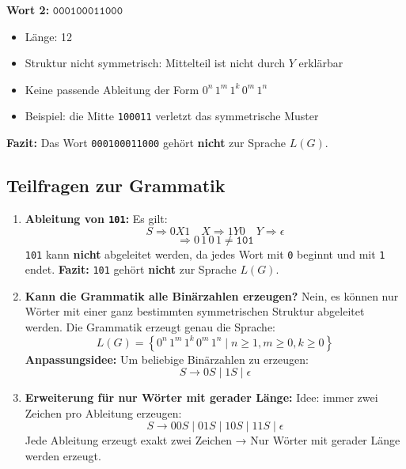 \documentclass[a4paper,12pt]{article}
\begin{document}
\textbf{Wort 2:} \( \texttt{000100011000} \)

\begin{itemize}
	\item Länge: 12
	\item Struktur nicht symmetrisch: Mittelteil ist nicht durch \( Y \) erklärbar
	\item Keine passende Ableitung der Form \( 0^n\,1^m\,1^k\,0^m\,1^n \)
	\item Beispiel: die Mitte \texttt{100011} verletzt das symmetrische Muster
\end{itemize}

\textbf{Fazit:} Das Wort \texttt{000100011000} gehört \textbf{nicht} zur Sprache \( L(G) \).

\subsection*{Teilfragen zur Grammatik}

\begin{enumerate}
	\item \textbf{Ableitung von \texttt{101}:}  
	Es gilt:  
	\[
	S \Rightarrow 0 X 1 \quad X \Rightarrow 1 Y 0 \quad Y \Rightarrow \epsilon
	\]
	\[
	\Rightarrow 0 \, 1 \, 0 \, 1 \neq \texttt{101}
	\]
	\texttt{101} kann \textbf{nicht} abgeleitet werden, da jedes Wort mit \texttt{0} beginnt und mit \texttt{1} endet.  
	\textbf{Fazit:} \texttt{101} gehört \textbf{nicht} zur Sprache \( L(G) \).
	
	\item \textbf{Kann die Grammatik alle Binärzahlen erzeugen?}  
	Nein, es können nur Wörter mit einer ganz bestimmten symmetrischen Struktur abgeleitet werden.  
	Die Grammatik erzeugt genau die Sprache:
	\[
	L(G) = \left\{ 0^n \, 1^m \, 1^k \, 0^m \, 1^n \mid n \geq 1, m \geq 0, k \geq 0 \right\}
	\]
	\textbf{Anpassungsidee:} Um beliebige Binärzahlen zu erzeugen:
	\[
	S \rightarrow 0 S \mid 1 S \mid \epsilon
	\]
	
	\item \textbf{Erweiterung für nur Wörter mit gerader Länge:}  
	Idee: immer zwei Zeichen pro Ableitung erzeugen:
	\[
	S \rightarrow 00 S \mid 01 S \mid 10 S \mid 11 S \mid \epsilon
	\]
	Jede Ableitung erzeugt exakt zwei Zeichen → Nur Wörter mit gerader Länge werden erzeugt.
\end{enumerate}


	
	
	
	
	
\newpage	
	
\end{document}
